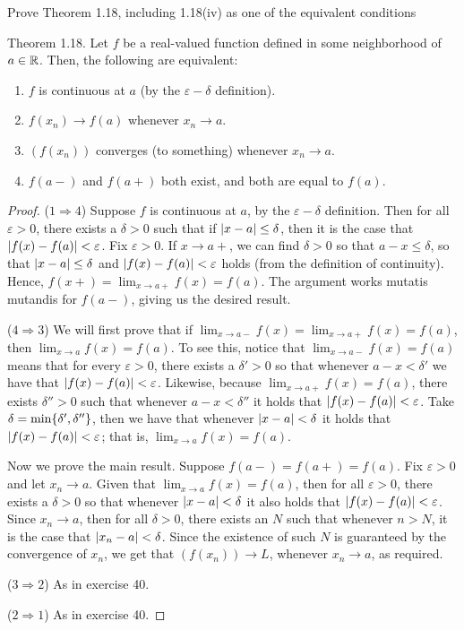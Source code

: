 \begin{exercise}{41}
Prove Theorem 1.18, including 1.18(iv) as one of the equivalent conditions

Theorem 1.18. Let $f$ be a real-valued function defined in some neighborhood of $a\in\mathbb{R}$. Then, the following are equivalent:
\begin{enumerate}
    \item $f$ is continuous at $a$ (by the $\varepsilon-\delta$ definition).
    \item $f(x_n)\to f(a)$ whenever $x_n\to a$.
    \item $(f(x_n))$ converges (to something) whenever $x_n\to a$.
    \item $f(a-)$ and $f(a+)$ both exist, and both are equal to $f(a).$
\end{enumerate}
\end{exercise}
\begin{proof}
($1\Rightarrow 4$) Suppose $f$ is continuous at $a$, by the $\varepsilon-\delta$ definition. Then for all $\varepsilon>0$, there exists a $\delta >0$ such that if $\left\lvert x-a\right\rvert\leq\delta$, then it is the case that $\left\lvert f(x)-f(a)\right\rvert<\varepsilon$. Fix $\varepsilon>0$. If $x\to a+$, we can find $\delta>0$ so that $a-x\leq\delta$, so that $\left\lvert x-a\right\rvert\leq\delta$ and $\left\lvert f(x)-f(a)\right\rvert<\varepsilon$ holds (from the definition of continuity). Hence, $f(x+)=\lim_{x\to a+}f(x)=f(a)$. The argument works mutatis mutandis for $f(a-)$, giving us the desired result.

($4\Rightarrow 3$) We will first prove that if $\lim_{x\to a-}f(x) =\lim_{x\to a+}f(x) =f(a)$, then $\lim_{x\to a}f(x)= f(a)$. To see this, notice that $\lim_{x\to a-}f(x)=f(a)$ means that for every $\varepsilon>0$, there exists a $\delta'>0$ so that whenever $a-x<\delta'$ we have that $\left\lvert f(x)-f(a)\right\rvert<\varepsilon$. Likewise, because $\lim_{x\to a+}f(x)=f(a)$, there exists $\delta''>0$ such that whenever $a-x<\delta''$ it holds that $\left\lvert f(x)-f(a)\right\rvert<\varepsilon$. Take $\delta =\min\{\delta',\delta''\}$, then we have that whenever $\left\lvert x-a\right\rvert<\delta$ it holds that $\left\lvert f(x)-f(a)\right\rvert<\varepsilon$; that is, $\lim_{x\to a}f(x)=f(a)$.

Now we prove the main result. Suppose $f(a-)=f(a+)=f(a)$. Fix $\varepsilon>0$ and let $x_n\to a$. Given that $\lim_{x\to a}f(x)=f(a)$, then for all $\varepsilon>0$, there exists a $\delta>0$ so that whenever $\left\lvert x-a\right\rvert<\delta$ it also holds that $\left\lvert f(x)-f(a)\right\rvert<\varepsilon$. Since $x_n\to a$, then for all $\delta>0$, there exists an $N$ such that whenever $n> N$, it is the case that $\left\lvert x_n-a\right\rvert<\delta$. Since the existence of such $N$ is guaranteed by the convergence of $x_n$, we get that $(f(x_n))\to L$, whenever $x_n\to a$, as required.

($3\Rightarrow 2$) As in exercise 40.

($2\Rightarrow 1$) As in exercise 40.
\end{proof}

